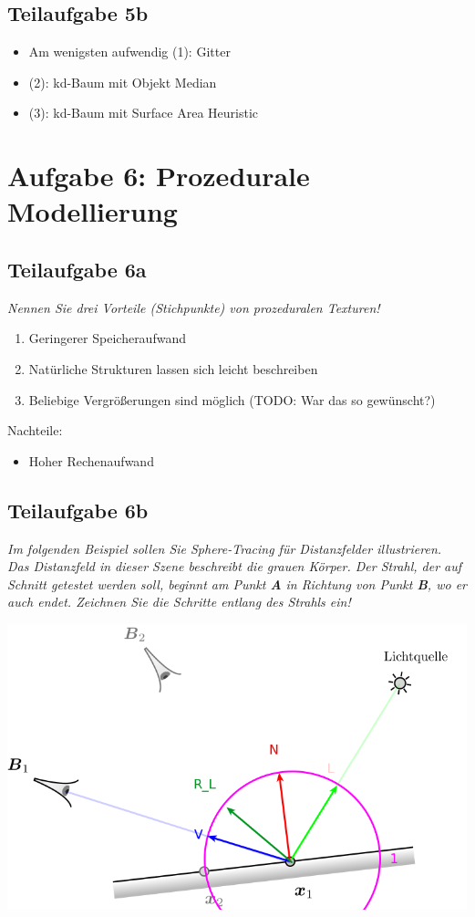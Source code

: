\documentclass[a4paper]{scrartcl}
\begin{document}
\subsection*{Teilaufgabe 5b}

\begin{itemize}
    \item Am wenigsten aufwendig (1): Gitter
    \item (2): kd-Baum mit Objekt Median
    \item (3): kd-Baum mit Surface Area Heuristic
\end{itemize}

\section*{Aufgabe 6: Prozedurale Modellierung}
\subsection*{Teilaufgabe 6a}
\textit{Nennen Sie drei Vorteile (Stichpunkte) von prozeduralen Texturen!}

\begin{enumerate}[label=(\arabic*)]
    \item Geringerer Speicheraufwand
    \item Natürliche Strukturen lassen sich leicht beschreiben
    \item Beliebige Vergrößerungen sind möglich (TODO: War das so gewünscht?)
\end{enumerate}

Nachteile:

\begin{itemize}
    \item Hoher Rechenaufwand
\end{itemize}

\clearpage
\subsection*{Teilaufgabe 6b}
\textit{Im folgenden Beispiel sollen Sie Sphere-Tracing für Distanzfelder
illustrieren. Das Distanzfeld in dieser Szene beschreibt die grauen Körper. Der
Strahl, der auf Schnitt getestet werden soll, beginnt am Punkt \textbf{A} in
Richtung von Punkt \textbf{B}, wo er auch endet. Zeichnen Sie die Schritte
entlang des Strahls ein!}

\includegraphics*[width=0.8\linewidth, keepaspectratio]{2a.png}
\end{document}
